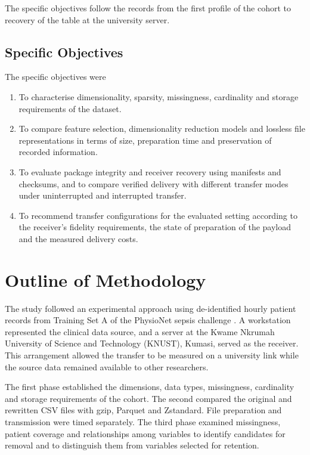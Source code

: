 \noindent The specific objectives follow the records from the first profile of the cohort to recovery of the table at the university server.

\subsection{Specific Objectives}
\noindent The specific objectives were
\begin{enumerate}
\item To characterise dimensionality, sparsity, missingness, cardinality and storage requirements of the dataset.
\item To compare feature selection, dimensionality reduction models and lossless file representations in terms of size, preparation time and preservation of recorded information.
\item To evaluate package integrity and receiver recovery using manifests and checksums, and to compare verified delivery with different transfer modes under uninterrupted and interrupted transfer.
\item To recommend transfer configurations for the evaluated setting according to the receiver's fidelity requirements, the state of preparation of the payload and the measured delivery costs.
\end{enumerate}

\section{Outline of Methodology}\label{Outline of Methodology}
\noindent The study followed an experimental approach using de-identified hourly patient records from Training Set A of the PhysioNet sepsis challenge \citep{Reyna2019}. A workstation represented the clinical data source, and a server at the Kwame Nkrumah University of Science and Technology (KNUST), Kumasi, served as the receiver. This arrangement allowed the transfer to be measured on a university link while the source data remained available to other researchers.

\noindent The first phase established the dimensions, data types, missingness, cardinality and storage requirements of the cohort. The second compared the original and rewritten CSV files with gzip, Parquet and Zstandard. File preparation and transmission were timed separately. The third phase examined missingness, patient coverage and relationships among variables to identify candidates for removal and to distinguish them from variables selected for retention.

